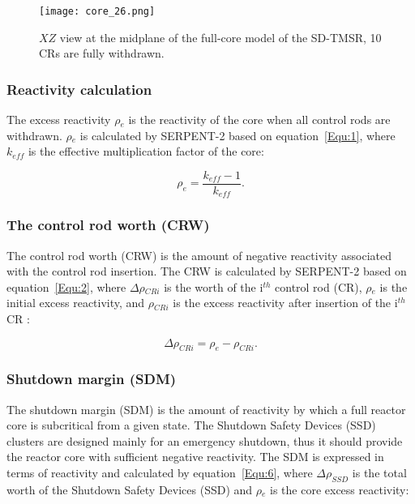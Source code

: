 \begin{figure}[t!] %
	\centering
	\texttt{[image: core\_26.png]}
	\caption{$XZ$ view at the midplane of the full-core model of the SD-TMSR, 10 CRs are fully withdrawn.}
	\label{fig:core_26}
\end{figure}

\subsubsection{Reactivity calculation}

The excess reactivity $\rho$$_e$ is the reactivity of the core when all control rods are withdrawn. $\rho$$_e$ is calculated by SERPENT-2 based on equation~\ref{Equ:1}, where $k_{eff}$ is the effective multiplication factor of the core:

\begin{equation}
\label{Equ:1}
{{\rho}_{e}}=\dfrac{{k_{eff}}-1}{{k_{eff}}}.
\end{equation}

\subsubsection{The control rod worth (CRW)}

The control rod worth (CRW) is the amount of negative reactivity associated with the control rod insertion. The CRW is calculated by SERPENT-2 based on equation~\ref{Equ:2}, where $\Delta\rho$$_{CRi}$ is the worth of the i$^{th}$ control rod (CR), $\rho$$_e$ is the initial excess reactivity, and $\rho$$_{CRi}$ is the excess reactivity after insertion of the i$^{th}$ CR \cite{vcerba2017optimization}:

\begin{equation}
\label{Equ:2}
{{\Delta}{\rho}_{CRi}}={{\rho}_{e}}-{{\rho}_{CRi}}.
\end{equation}

\subsubsection{Shutdown margin (SDM)}

The shutdown margin (SDM) is the amount of reactivity by which a full reactor core is subcritical from a given state. The Shutdown Safety Devices (SSD) clusters are designed mainly for an emergency shutdown, thus it should 
provide the reactor core with sufficient negative reactivity. The SDM is expressed in terms of reactivity and calculated by equation~\ref{Equ:6}, where $\Delta\rho_{SSD}$ is the total worth of the Shutdown Safety Devices (SSD) and $\rho$$_e$ is the core excess reactivity:

